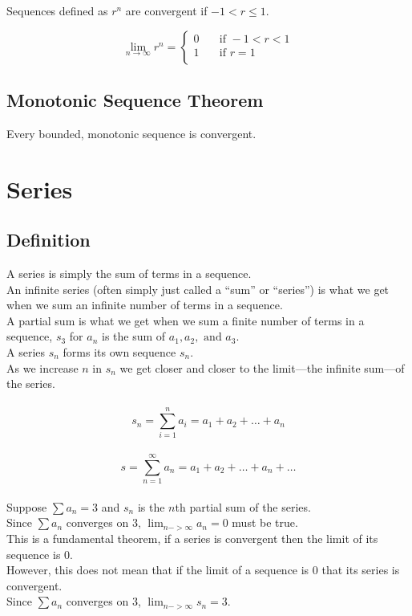 \documentclass[12pt]{article}
\begin{document}
Sequences defined as ${r^n}$ are convergent if $-1 < r \leq 1$.

\[ \lim_{n\to\infty} r^n =
    \begin{cases}
        0 & \quad \text{if } -1 < r < 1\\
        1 & \quad \text{if } r = 1\\
    \end{cases}
\]


\subsection{Monotonic Sequence Theorem}

Every bounded, monotonic sequence is convergent.


\section{Series}


\subsection{Definition}

A series is simply the sum of terms in a sequence.\\
An infinite series (often simply just called a ``sum'' or ``series'') is what we get when we sum an infinite number of terms in a sequence.\\
A partial sum is what we get when we sum a finite number of terms in a sequence, $s_3$ for ${a_n}$ is the sum of $a_1, a_2,\text{ and } a_3$.\\
A series $s_n$ forms its own sequence ${s_n}$.\\
As we increase $n$ in ${s_n}$ we get closer and closer to the limit---the infinite sum---of the series.\\
\\
\begin{displaymath}
s_n = \sum_{i=1}^{n} a_i = a_1 + a_2 + \dots + a_n
\end{displaymath}
\\
\begin{displaymath}
s = \sum_{n=1}^{\infty} a_n = a_1 + a_2 + \dots + a_n + \dots
\end{displaymath}
\\
Suppose $\sum a_n =3$ and $s_n$ is the $n$th partial sum of the series.\\
Since $\sum a_n$ converges on $3$, $\lim_{n->\infty} a_n = 0$ must be true.\\
This is a fundamental theorem, if a series is convergent then the limit of its sequence is 0.\\
However, this does not mean that if the limit of a sequence is 0 that its series is convergent.\\
Since $\sum a_n$ converges on $3$, $\lim_{n->\infty} s_n = 3$.
\end{document}
